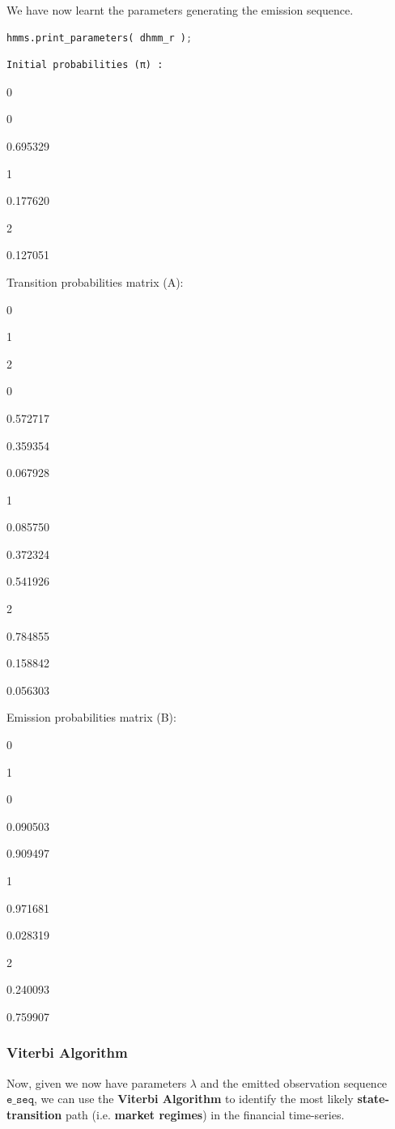 We have now learnt the parameters generating the emission sequence.

\begin{lstlisting}[language=Python]
hmms.print_parameters( dhmm_r );
\end{lstlisting}

\begin{lstlisting}
Initial probabilities (π) :
\end{lstlisting}

0

0

0.695329

1

0.177620

2

0.127051

Transition probabilities matrix (A):

0

1

2

0

0.572717

0.359354

0.067928

1

0.085750

0.372324

0.541926

2

0.784855

0.158842

0.056303

Emission probabilities matrix (B):

0

1

0

0.090503

0.909497

1

0.971681

0.028319

2

0.240093

0.759907

\hypertarget{viterbi-algorithm}{%
\subsubsection{Viterbi Algorithm}\label{viterbi-algorithm}}

Now, given we now have parameters \(\lambda\) and the emitted
observation sequence \(\texttt{e_seq}\), we can use the \textbf{Viterbi
Algorithm} to identify the most likely \textbf{state-transition} path
(i.e. \textbf{market regimes}) in the financial time-series.

